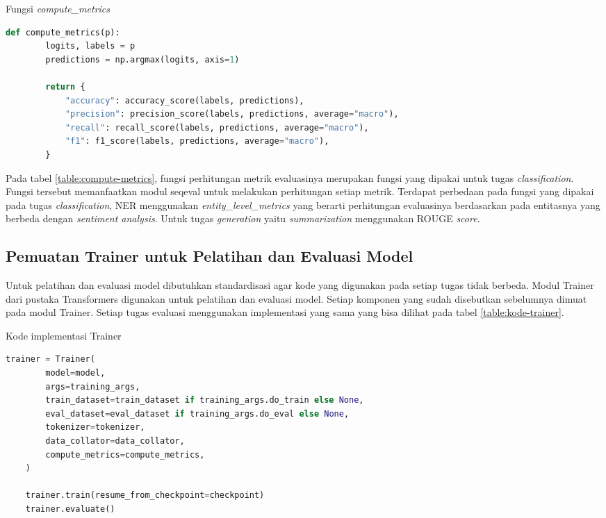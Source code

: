 \begin{table}[h]
    \caption{Fungsi \textit{compute\_metrics}}
    \label{table:compute-metrics}
    \begin{lstlisting}[language=python]
    def compute_metrics(p):
        logits, labels = p
        predictions = np.argmax(logits, axis=1)

        return {
            "accuracy": accuracy_score(labels, predictions),
            "precision": precision_score(labels, predictions, average="macro"),
            "recall": recall_score(labels, predictions, average="macro"),
            "f1": f1_score(labels, predictions, average="macro"),
        }
    \end{lstlisting}
\end{table}

Pada tabel \ref{table:compute-metrics}, fungsi perhitungan metrik evaluasinya merupakan fungsi yang dipakai untuk tugas \textit{classification}. Fungsi tersebut memanfaatkan modul seqeval untuk melakukan perhitungan setiap metrik. Terdapat perbedaan pada fungsi yang dipakai pada tugas \textit{classification}, NER menggunakan \textit{entity\_level\_metrics} yang berarti perhitungan evaluasinya berdasarkan pada entitasnya yang berbeda dengan \textit{sentiment analysis}. Untuk tugas \textit{generation} yaitu \textit{summarization} menggunakan ROUGE \textit{score}.

\subsection{Pemuatan Trainer untuk Pelatihan dan Evaluasi Model}

Untuk pelatihan dan evaluasi model dibutuhkan standardisasi agar kode yang digunakan pada setiap tugas tidak berbeda. Modul Trainer dari pustaka Transformers digunakan untuk pelatihan dan evaluasi model. Setiap komponen yang sudah disebutkan sebelumnya  dimuat pada modul Trainer. Setiap tugas evaluasi  menggunakan implementasi yang sama yang bisa dilihat pada tabel \ref{table:kode-trainer}.

\begin{table}[h]
    \caption{Kode implementasi Trainer}
    \label{table:kode-trainer}
    \begin{lstlisting}[language=python]
    trainer = Trainer(
        model=model,
        args=training_args,
        train_dataset=train_dataset if training_args.do_train else None,
        eval_dataset=eval_dataset if training_args.do_eval else None,
        tokenizer=tokenizer,
        data_collator=data_collator,
        compute_metrics=compute_metrics,
    )

    trainer.train(resume_from_checkpoint=checkpoint)
    trainer.evaluate()
    \end{lstlisting}
\end{table}

